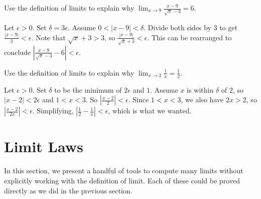 \begin{exercises}
\begin{exercise} 
Use the definition of limits to explain why $\lim_{x\to 9} \frac{x-9}{\sqrt{x}-3}
= 6$.
\begin{answer}
  Let $\epsilon > 0$.  Set $\delta = 3\epsilon$.  Assume $0 < |x-9| < \delta$.  Divide both sides by $3$ to get $\frac{|x-9|}{3} < \epsilon$.  Note that $\sqrt{x}+3 > 3$, so $\frac{|x-9|}{\sqrt{x} + 3} < \epsilon$.  This can be rearranged to conclude $\left|\frac{x-9}{\sqrt{x} - 3} - 6\right| < \epsilon$.
\end{answer}
\end{exercise}


\begin{exercise} 
Use the definition of limits to explain why $\lim_{x\to 2}\frac{1}{x}
= \frac{1}{2}$.
\begin{answer}
  Let $\epsilon > 0$.  Set $\delta$ to be the minimum of $2\epsilon$ and $1$.  Assume $x$ is within $\delta$ of $2$, so $|x - 2| < 2 \epsilon$ and $1 < x < 3$.  So $\left| \frac{x-2}{2} \right| < \epsilon$.  Since $1 < x < 3$, we also have $2x > 2$, so $\left| \frac{x-2}{2x} \right| < \epsilon$.  Simplifying, $\left| \frac{1}{2} - \frac{1}{x} \right| < \epsilon$, which is what we wanted.
\end{answer}
\end{exercise}






\end{exercises}


\section{Limit Laws}

In this section, we present a handful of tools to compute many limits
without explicitly working with the definition of limit. Each of these
could be proved directly as we did in the previous section.


